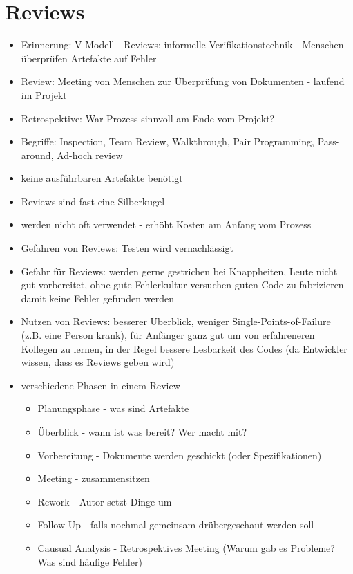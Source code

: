 \documentclass[paper=a4, fontsize=11pt]{scrartcl} %
\numberwithin{equation}{section} %
\numberwithin{figure}{section} %
\numberwithin{table}{section} %
\begin{document}
\section{Reviews}

\begin{itemize}
  \item Erinnerung: V-Modell - Reviews: informelle Verifikationstechnik - Menschen überprüfen Artefakte auf Fehler
  \item Review: Meeting von Menschen zur Überprüfung von Dokumenten - laufend im Projekt
  \item Retrospektive: War Prozess sinnvoll am Ende vom Projekt?
  \item Begriffe: Inspection, Team Review, Walkthrough, Pair Programming, Pass-around, Ad-hoch review
  \item keine ausführbaren Artefakte benötigt
  \item Reviews sind fast eine Silberkugel
  \item werden nicht oft verwendet - erhöht Kosten am Anfang vom Prozess
  \item Gefahren von Reviews: Testen wird vernachlässigt
  \item Gefahr für Reviews: werden gerne gestrichen bei Knappheiten, Leute nicht gut vorbereitet, ohne gute Fehlerkultur versuchen guten Code zu fabrizieren damit keine Fehler gefunden werden
  \item Nutzen von Reviews: besserer Überblick, weniger Single-Points-of-Failure (z.B. eine Person krank), für Anfänger ganz gut um von erfahreneren Kollegen zu lernen, in der Regel bessere Lesbarkeit des Codes (da Entwickler wissen, dass es Reviews geben wird)
  \item verschiedene Phasen in einem Review
  \begin{itemize}
    \item Planungsphase - was sind Artefakte
    \item Überblick - wann ist was bereit? Wer macht mit?
    \item Vorbereitung - Dokumente werden geschickt (oder Spezifikationen)
    \item Meeting - zusammensitzen
    \item Rework - Autor setzt Dinge um
    \item Follow-Up - falls nochmal gemeinsam drübergeschaut werden soll
    \item Causual Analysis - Retrospektives Meeting (Warum gab es Probleme? Was sind häufige Fehler)
  \end{itemize}

\end{itemize}
\end{document}
